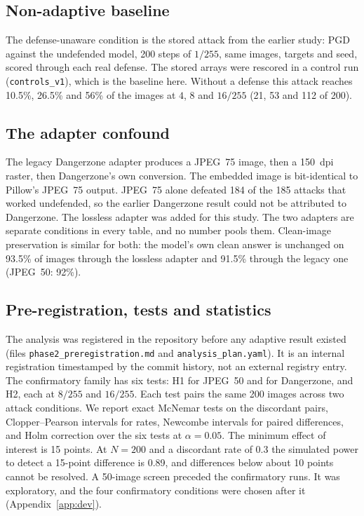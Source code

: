 \documentclass[11pt]{article}
\begin{document}
\subsection{Non-adaptive baseline}
The defense-unaware condition is the stored attack from the earlier study: PGD against the
undefended model, 200 steps of $1/255$, same images, targets and seed, scored through each
real defense. The stored arrays were rescored in a control run (\texttt{controls\_v1}), which
is the baseline here. Without a defense this attack reaches 10.5\%, 26.5\% and 56\% of the
images at $4$, $8$ and $16/255$ (21, 53 and 112 of 200).

\subsection{The adapter confound}
\label{sec:confound}
The legacy Dangerzone adapter produces a JPEG~75 image, then a 150~dpi raster, then
Dangerzone's own conversion. The embedded image is bit-identical to Pillow's JPEG~75
output. JPEG~75 alone defeated 184 of the 185 attacks that worked undefended, so the earlier
Dangerzone result could not be attributed to Dangerzone. The lossless adapter was added
for this study. The two adapters are separate conditions in every table, and no number
pools them. Clean-image preservation is similar for both: the model's own clean answer is
unchanged on 93.5\% of images through the lossless adapter and 91.5\% through the legacy one
(JPEG~50: 92\%).

\subsection{Pre-registration, tests and statistics}
\label{sec:prereg}
The analysis was registered in the repository before any adaptive result existed
(files \texttt{phase2\_preregistration.md} and \texttt{analysis\_plan.yaml}). It is an
internal registration timestamped by the commit history, not an external registry entry.
The confirmatory family has six tests: H1 for JPEG~50 and for Dangerzone, and H2, each at
$8/255$ and $16/255$. Each test pairs the same 200 images across two attack conditions.
We report exact McNemar tests on the discordant pairs, Clopper--Pearson intervals for rates,
Newcombe intervals for paired differences, and Holm correction over the six tests at
$\alpha=0.05$. The minimum effect of interest is 15 points. At $N=200$ and a discordant rate
of 0.3 the simulated power to detect a 15-point difference is 0.89, and differences below
about 10 points cannot be resolved. A 50-image screen preceded the confirmatory runs. It was
exploratory, and the four confirmatory conditions were chosen after it (Appendix~\ref{app:dev}).
\end{document}
